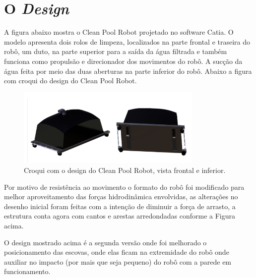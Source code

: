 \section{O \textit{Design}}
A figura abaixo mostra o Clean Pool Robot projetado no software Catia. O modelo apresenta dois rolos de limpeza, localizados na parte frontal e traseira do robô, um duto, na parte superior para a saída da água filtrada e também funciona como propulsão e direcionador dos movimentos do robô. A sucção da água feita por meio das duas aberturas na parte inferior do robô. Abaixo a figura com croqui do design do Clean Pool Robot.
\par
  \begin{figure}[h]
    \centering
    \includegraphics[width=0.8\textwidth]{figures/croqui-design-cpr.png}
    \caption{Croqui com o design do Clean Pool Robot, vista frontal e inferior.}
    \label{fig:croqui-design-cpr}
  \end{figure}
  \FloatBarrier
\par
Por motivo de resistência ao movimento o formato do robô foi modificado para melhor aproveitamento das forças hidrodinâmica envolvidas, as alterações no desenho inicial foram feitas com a intenção de diminuir a força de arrasto, a estrutura conta agora com cantos e arestas arredondadas conforme a Figura acima.

O design mostrado acima é a segunda versão onde foi melhorado o posicionamento das escovas, onde elas ficam na extremidade do robô onde auxiliar no impacto (por mais que seja pequeno) do robô com a parede em funcionamento.

